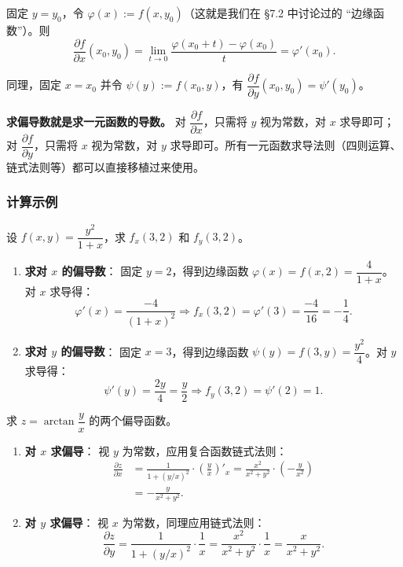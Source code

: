 \documentclass[lang=cn,11pt]{elegantbook}
\begin{document}
固定 $y=y_0$，令 $\varphi(x):=f(x,y_0)$（这就是我们在 §7.2 中讨论过的 ``边缘函数''）。则
\[
\frac{\partial f}{\partial x}(x_0,y_0) =\lim_{t\to 0}\frac{\varphi(x_0+t)-\varphi(x_0)}{t} =\varphi'(x_0).
\]

同理，固定 $x=x_0$ 并令 $\psi(y):=f(x_0,y)$，有 $\dfrac{\partial f}{\partial y}(x_0,y_0)=\psi'(y_0)$。

\begin{property}[偏导数的本质]
\textbf{求偏导数就是求一元函数的导数。}
对 $\dfrac{\partial f}{\partial x}$，只需将 $y$ 视为常数，对 $x$ 求导即可；对 $\dfrac{\partial f}{\partial y}$，只需将 $x$ 视为常数，对 $y$ 求导即可。所有一元函数求导法则（四则运算、链式法则等）都可以直接移植过来使用。
\end{property}

\subsubsection*{计算示例}

\begin{exercise}[在某点处求偏导数值] \label{ex:pd-at-point}
设 $f(x,y)=\dfrac{y^2}{1+x}$，求 $f_x(3,2)$ 和 $f_y(3,2)$。
\end{exercise}
\begin{solution}
\begin{enumerate}
  \item \textbf{求对 $x$ 的偏导数}：
  固定 $y=2$，得到边缘函数 $\varphi(x)=f(x,2)=\dfrac{4}{1+x}$。对 $x$ 求导得：
  \[
  \varphi'(x)=\frac{-4}{(1+x)^2} \Longrightarrow f_x(3,2)=\varphi'(3)=\frac{-4}{16}=-\frac{1}{4}.
  \]
  \item \textbf{求对 $y$ 的偏导数}：
  固定 $x=3$，得到边缘函数 $\psi(y)=f(3,y)=\dfrac{y^2}{4}$。对 $y$ 求导得：
  \[
  \psi'(y)=\frac{2y}{4}=\frac{y}{2} \Longrightarrow f_y(3,2)=\psi'(2)=1.
  \]
\end{enumerate}
\end{solution}

\begin{exercise} \label{ex:pd-analytic}
求 $z=\arctan\dfrac{y}{x}$ 的两个偏导函数。
\end{exercise}

\begin{solution}
\begin{enumerate}
  \item \textbf{对 $x$ 求偏导}：
  视 $y$ 为常数，应用复合函数链式法则：
  \begin{align*}
  \frac{\partial z}{\partial x} &=\frac{1}{1+(y/x)^2}\cdot\left(\frac{y}{x}\right)'_{\!x} =\frac{x^2}{x^2+y^2}\cdot\left(-\frac{y}{x^2}\right)\\
  &=\boxed{-\frac{y}{x^2+y^2}}.
  \end{align*}
  
  \item \textbf{对 $y$ 求偏导}：
  视 $x$ 为常数，同理应用链式法则：
  \[
  \frac{\partial z}{\partial y} =\frac{1}{1+(y/x)^2}\cdot\frac{1}{x} =\frac{x^2}{x^2+y^2}\cdot\frac{1}{x} =\boxed{\frac{x}{x^2+y^2}}.
  \]
\end{enumerate}
\end{solution}
\end{document}
